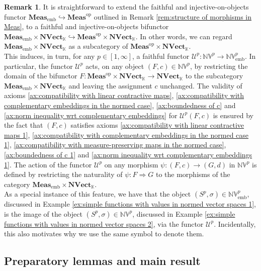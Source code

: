 \documentclass{amsart}
\theoremstyle{definition}
\newtheorem{remark}[definition]{Remark}
\theoremstyle{plain}
\newcommand{\opMeas}{\mathbf{Meas}^\mathrm{op}}
\newcommand{\embMeas}{\mathbf{Meas}_\mathrm{emb}}
\newcommand{\NVect}{\mathbf{NVect}_{\mathbb{K}}}
\newcommand{\NVembp}{\mathbb{NV}_{\mathrm{emb}}^p}
\newcommand{\NVp}{\mathbb{NV}^p}
\begin{document}
        \begin{remark}
        \label{rem:forgetful functor from NVp to NVembp}
            It is straightforward to extend the faithful and injective-on-objects functor $\embMeas \hookrightarrow \opMeas$ outlined in Remark \ref{rem:structure of morphisms in Meas}, to a faithful and injective-on-objects bifunctor $\embMeas \times \NVect \hookrightarrow \opMeas \times \NVect$. 
            In other words, we can regard $\embMeas \times \NVect$ as a subcategory of $\opMeas \times \NVect$. \\
            This induces, in turn, for any $p \in [1,\infty]$, a faithful functor $\mathcal{U}^p \colon \NVp \rightarrow \NVembp$. 
            In particular, the functor $\mathcal{U}^p$ acts, on any object $(F,c) \in \NVp$, by restricting the domain of the bifunctor $F \colon \opMeas \times \NVect \rightarrow \NVect$ to the subcategory $\embMeas \times \NVect$ and leaving the assignment $c$ unchanged.
            The validity of axioms \ref{ax:compatibility with linear contractive maps}, \ref{ax:compatibility with complementary embeddings in the normed case}, \ref{ax:boundedness of c} and \ref{ax:norm inequality wrt complementary embeddings} for $\mathcal{U}^p(F,c)$ is ensured by the fact that $(F,c)$ satisfies axioms \ref{ax:compatibility with linear contractive maps 1}, \ref{ax:compatibility with complementary embeddings in the normed case 1}, \ref{ax:compatibility with measure-preserving maps in the normed case}, \ref{ax:boundedness of c 1} and \ref{ax:norm inequality wrt complementary embeddings 1}.    
            The action of the functor $\mathcal{U}^p$ on any morphism $\psi \colon (F,c) \rightarrow (G,d)$ in $\NVp$ is defined by restricting the naturality of $\psi \colon F \Rightarrow G$ to the morphisms of the category $\embMeas \times \NVect$. \\
            As a special instance of this feature, we have that the object $(S^p,\sigma) \in \NVembp$, discussed in Example \ref{ex:simple functions with values in normed vector spaces 1}, is the image of the object $(S^p,\sigma) \in \NVp$, discussed in Example \ref{ex:simple functions with values in normed vector spaces 2}, via the functor $\mathcal{U}^p$.
            Incidentally, this also motivates why we use the same symbol to denote them.   
        \end{remark}

    
    \subsection{Preparatory lemmas and main result}
    \label{sec:preparatory lemmas and main result}
    
\end{document}
